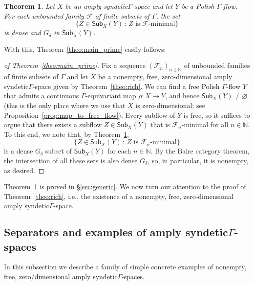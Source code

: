 \documentclass[11pt,reqno,psamsfonts]{amsart}
\theoremstyle{bfnote}
\newtheorem{theo}{Theorem}[section]
\theoremstyle{definition}
\theoremstyle{remark}
\newcommand{\0}{\varnothing}
\newcommand{\set}[1]{\{#1\}}
\newcommand{\G}{\Gamma}
\newcommand{\N}{\mathbb{N}}
\newcommand{\Sub}{\mathsf{Sub}}
\newcommand{\sr}{amply syndetic\xspace}
\numberwithin{equation}{section}
\newenvironment{scproof}[1][]{\begin{proof}[\textsc{\upshape{Proof}}#1]}{\end{proof}}
\begin{document}
    \begin{tcolorbox}
    \begin{theo}\label{theo:generic}
        Let $X$ be an \sr $\G$-space and let $Y$ be a Polish $\G$-flow. For each %
        unbounded family $\mathcal{F}$ of finite subsets of $\G$, the set \[\set{Z \in \Sub_X(Y) \,:\, \text{$Z$ is $\mathcal{F}$-minimal}}\] is dense and $G_\delta$ in $\Sub_X(Y)$.
    \end{theo}
    \end{tcolorbox}

    With this, Theorem~\ref{theo:main_prime} easily follows:

    \begin{scproof}[ of Theorem~\ref{theo:main_prime}]
        Fix a sequence $(\mathcal{F}_n)_{n \in \N}$ of unbounded families of finite subsets of $\G$ %
        and let $X$ be a nonempty, free, zero-dimensional \sr $\G$-space given by Theorem~\ref{theo:rich}. We can find a free Polish $\G$-flow $Y$ that admits a continuous $\G$-equivariant map $\rho \colon X \to Y$, and hence $\Sub_X(Y) \neq \0$ (this is the only place where we use that $X$ is zero-dimensional; see Proposition~\ref{prop:map_to_free_flow}). Every subflow of $Y$ is free, so it suffices to argue that there exists a subflow $Z \in \Sub_X(Y)$ that is $\mathcal{F}_n$-minimal for all $n \in \N$. To this end, we note that, by Theorem~\ref{theo:generic}, \[\set{Z \in \Sub_X(Y) \,:\, \text{$Z$ is $\mathcal{F}_n$-minimal}}\] is a dense $G_\delta$ subset of $\Sub_X(Y)$ for each $n \in \N$. By the Baire category theorem, the intersection of all these sets is also dense $G_\delta$, so, in particular, it is nonempty, as desired.
    \end{scproof}

    Theorem~\ref{theo:generic} is proved in \S\ref{sec:generic}. We now turn our attention to the proof of Theorem~\ref{theo:rich}, i.e., the existence of a nonempty, free, zero-dimensional \sr $\G$-space.

    \subsection{Separators and examples of \sr $\G$-spaces}\label{subsubsec:example}

    In this subsection we describe a family of simple concrete examples of nonempty, free, zero\=/dimensional \sr $\G$-spaces. %
    
\end{document}
